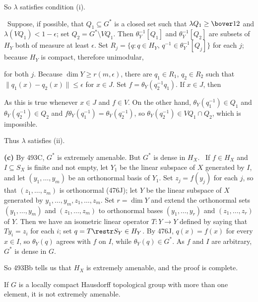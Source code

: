 {\noindent So $\lambda$ satisfies condition (i).

\Quer\ Suppose, if possible, that $Q_1\subseteq G^*$ is a closed set
such that $\lambda Q_1\ge\bover12$ and $\lambda(VQ_1)<1-\epsilon$;  set
$Q_2=G^*\setminus VQ_1$.   Then
$\theta_Y^{-1}[Q_1]$ and $\theta_Y^{-1}[Q_2]$ are subsets of $H_Y$ both
of measure at least $\epsilon$.   Set
$R_j=\{q:q\in H_Y,\,q^{-1}\in\theta_Y^{-1}[Q_j]\}$ for each $j$;
because
$H_Y$ is compact, therefore unimodular,


\noindent for both $j$.   Because $\dim Y\ge r(m,\epsilon)$,
there are $q_1\in R_1$, $q_2\in R_2$ such that
$\|q_1(x)-q_2(x)\|\le\epsilon$ for $x\in J$.   Set
$f=\theta_Y(q_2^{-1}q_1)$.   If $x\in J$, then


\noindent As this is true whenever $x\in J$ and $f\in V$.   On the other
hand, $\theta_Y(q_1^{-1})\in Q_1$ and $\theta_Y(q_2^{-1})\in Q_2$ and
$f\theta_Y(q_1^{-1})=\theta_Y(q_2^{-1})$, so
$\theta_Y(q_2^{-1})\in VQ_1\cap Q_2$, which is impossible.\ \Bang

Thus $\lambda$ satisfies (ii).\ \Qed

\medskip

{\bf (c)} By 493C, $G^*$ is extremely amenable.   But $G^*$ is dense in
$H_X$.   \Prf\ If $f\in H_X$ and $I\subseteq S_X$ is finite and not
empty, let $Y_1$ be the linear subspace of $X$ generated by $I$, and let
$(y_1,\ldots,y_m)$ be an orthonormal basis of $Y_1$.   Set $z_j=f(y_j)$
for each $j$, so that $(z_1,\ldots,z_m)$ is orthonormal (476J);  let $Y$
be the linear subspace of $X$ generated by
$y_1,\ldots,y_m,z_1,\ldots,z_m$.   Set $r=\dim Y$ and extend the
orthonormal sets $(y_1,\ldots,y_m)$ and $(z_1,\ldots,z_m)$ to
orthonormal bases $(y_1,\ldots,y_r)$ and $(z_1,\ldots,z_r)$ of $Y$.
Then we have an isometric linear operator $T:Y\to Y$ defined by saying
that $Ty_i=z_i$ for each $i$;  set $q=T\restr S_Y\in H_Y$.   By 476J,
$q(x)=f(x)$ for every $x\in I$, so $\theta_Y(q)$ agrees with $f$ on $I$,
while $\theta_Y(q)\in G^*$.   As $f$ and $I$ are arbitrary, $G^*$ is
dense in $G$.\ \Qed

So 493Bb tells us that $H_X$ is extremely amenable, and the proof is
complete.
}%

 If $G$ is a locally
compact Hausdorff topological group with more than one element, it is
not extremely amenable.

